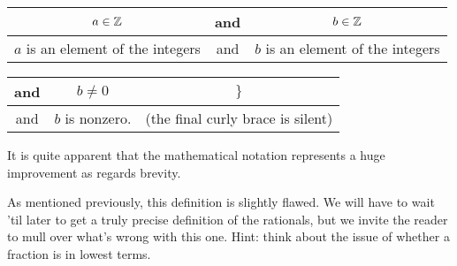 \vspace{.2in}

\begin{tabular}{c|c|c}
\rule[-10pt]{0pt}{22pt} $a \in {\mathbb Z}$ & and & $b \in {\mathbb Z}$ \\ \hline
\rule[-6pt]{0pt}{22pt} $a$ is an element of the integers & and & $b$ is an
element of the integers \\
\end{tabular}

\vspace{.2in}

\begin{tabular}{c|c|c}
\rule[-10pt]{0pt}{22pt} and & $b \neq 0$ & $\}$ \\ \hline
\rule[-6pt]{0pt}{22pt} and & $b$ is nonzero. & (the final curly brace
is silent) \\
\end{tabular}

\vspace{.2in}

It is quite apparent that the mathematical notation represents a huge
improvement as regards brevity. 

As mentioned previously, this definition is slightly flawed.  We will
have to wait 'til later to get a truly precise
definition of the rationals, but we invite the reader to mull over
what's wrong with this one.  Hint: think about the issue of whether
a fraction is in lowest terms.

